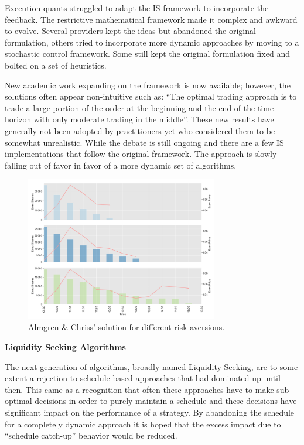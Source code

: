 Execution quants struggled to adapt the IS framework to incorporate the feedback. The restrictive mathematical framework made it complex and awkward to evolve. Several providers kept the ideas but abandoned the original formulation, others tried to incorporate more dynamic approaches by moving to a stochastic control framework. Some still kept the original formulation fixed and bolted on a set of heuristics.


New academic work expanding on the framework is now available; however, the solutions often appear non-intuitive such as: ``The optimal trading approach is to trade a large portion of the order at the beginning and the end of the time horizon with only moderate trading in the middle''. These new results have generally not been adopted by practitioners yet who considered them to be somewhat unrealistic. While the debate is still ongoing and there are a few IS implementations that follow the original framework. The approach is slowly falling out of favor in favor of a more dynamic set of algorithms. \twomedskip

	\begin{figure}[!ht]
	\centering
	\includegraphics[width=0.75\textwidth]{chapters/chapter_exec_models/figures/is.png} 
	\caption{Almgren \& Chriss' solution for different risk aversions. \label{fig:is}}
	\end{figure}



\noindent\textbf{Liquidity Seeking Algorithms} \twomedskip


The next generation of algorithms, broadly named Liquidity Seeking, are to some extent a rejection to schedule-based approaches that had dominated up until then. This came as a recognition that often these approaches have to make sub-optimal decisions in order to purely maintain a schedule and these decisions have significant impact on the performance of a strategy. By abandoning the schedule for a completely dynamic approach it is hoped that the excess impact due to ``schedule catch-up'' behavior would be reduced.


